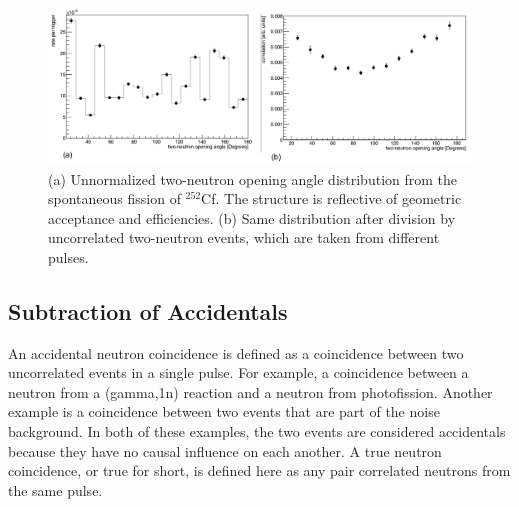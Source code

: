 \begin{figure}
    \centering
    \includegraphics[width  = \textwidth ]{Content/Methods/Normalization.png}
    \caption{(a) Unnormalized two-neutron opening angle distribution from the spontaneous fission of $^{252}$Cf. The structure is reflective of geometric acceptance and efficiencies. (b) Same distribution after division by uncorrelated two-neutron events, which are taken from different pulses.}
    \label{fig:OpeningAngleAcceptance}
    \label{fig:OpeningAngleAcceptance}
\end{figure}

\subsection{Subtraction of Accidentals}
\label{Subtraction of Accidentals}
An accidental neutron coincidence is defined as a coincidence between two uncorrelated events in a single pulse.
For example, a coincidence between a neutron from a (gamma,1n) reaction and a neutron from photofission.
Another example is a coincidence between two events that are part of the noise background.
In both of these examples, the two events are considered accidentals because they have no causal influence on each another.
A true neutron coincidence, or true for short, is defined here as any pair correlated neutrons from the same pulse.

